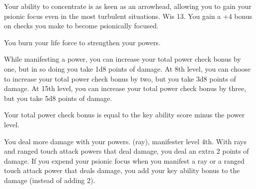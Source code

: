 {Your ability to concentrate is as keen as an arrowhead, allowing you to gain your psionic focus even in the most turbulent situations.}
{Wis 13.}
{You gain a +4 bonus on  checks you make to become psionically focused.}
{}{}

{You burn your life force to strengthen your powers.}
{}
{While manifesting a power, you can increase your total power check bonus by one, but in so doing you take 1d8 points of damage. At 8th level, you can choose to increase your total power check bonus by two, but you take 3d8 points of damage. At 15th level, you can increase your total power check bonus by three, but you take 5d8 points of damage.

}
{Your total power check bonus is equal to the key ability score minus the power level.}
{}


{You deal more damage with your powers.}
{ (ray), manifester level 4th.}
{With rays and ranged touch attack powers that deal damage, you deal an extra 2 points of damage. If you expend your psionic focus when you manifest a ray or a ranged touch attack power that deals damage, you add your key ability bonus to the damage (instead of adding 2).}
{}{}

